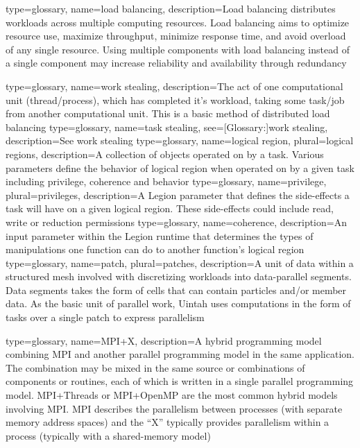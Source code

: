 {
  type={glossary},
  name={load balancing},
  description={Load balancing distributes workloads across multiple
  computing resources. Load balancing aims to optimize resource use,
  maximize throughput, minimize response time, and avoid overload of
  any single resource. Using multiple components with load balancing
  instead of a single component may increase reliability and
  availability through redundancy}  
}

{
  type={glossary},
  name={work stealing},
  description={The act of one computational unit (thread/process), which has completed it's workload, taking some task/job from another computational unit. This is a basic method of distributed load balancing}
}
{
  type={glossary},
  name={task stealing},
  see={[Glossary:]{work stealing}},
  description={See \gls{work stealing}}
}
{
  type={glossary},
  name={logical region},
  plural={logical regions},
  description={A collection of objects operated on by a task. Various parameters define the behavior of logical region when operated on by a given task including privilege, coherence and behavior}
}
{
  type={glossary},
  name={privilege},
  plural={privileges},
  description={A Legion parameter that defines the side-effects a task will have on a given logical region. These side-effects could include read, write or reduction permissions}
}
{
  type={glossary},
  name={coherence},
  description={An input parameter within the Legion runtime that determines the types of manipulations one function can do to another function's logical region}
}
{
  type={glossary},
  name={patch},
  plural={patches},
  description={A unit of data within a structured mesh involved with discretizing workloads into data-parallel segments. Data segments takes the form of cells that can contain particles and/or member data. As the basic unit of parallel work, Uintah uses computations in the form of tasks over a single patch to express parallelism}
}

{
  type={glossary},
  name={MPI+X},
  description={A hybrid \gls{programming model} combining \gls{MPI} and
  another parallel \gls{programming model} in the same application. The
  combination may be mixed in the same source or combinations of
  components or routines, each of which is written in a single parallel
  \gls{programming model}. \gls{MPI}+Threads or \gls{MPI}+OpenMP are the most
  common hybrid models involving \gls{MPI}. \gls{MPI} describes the
  parallelism between processes (with separate memory address spaces) and
  the ``X'' typically provides parallelism within a process (typically
  with a shared-memory model)}
}

